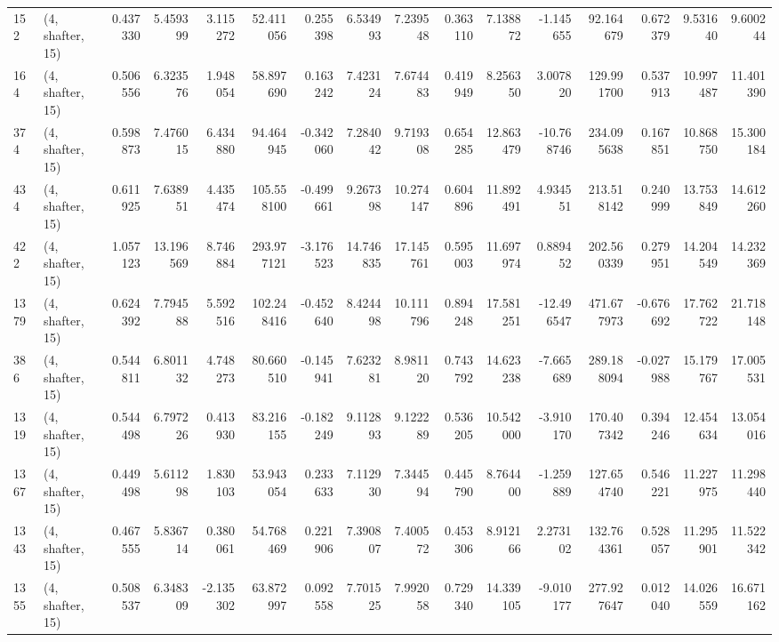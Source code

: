 \begin{tabular}{llrrrrrrrrrrrrrr}
152  &  (4, shafter, 15) &   0.437330 &   5.459399 &   3.115272 &     52.411056 &    0.255398 &    6.534993 &    7.239548 &  0.363110 &   7.138872 &  -1.145655 &    92.164679 &   0.672379 &   9.531640 &   9.600244 \\
164  &  (4, shafter, 15) &   0.506556 &   6.323576 &   1.948054 &     58.897690 &    0.163242 &    7.423124 &    7.674483 &  0.419949 &   8.256350 &   3.007820 &   129.991700 &   0.537913 &  10.997487 &  11.401390 \\
374  &  (4, shafter, 15) &   0.598873 &   7.476015 &   6.434880 &     94.464945 &   -0.342060 &    7.284042 &    9.719308 &  0.654285 &  12.863479 & -10.768746 &   234.095638 &   0.167851 &  10.868750 &  15.300184 \\
434  &  (4, shafter, 15) &   0.611925 &   7.638951 &   4.435474 &    105.558100 &   -0.499661 &    9.267398 &   10.274147 &  0.604896 &  11.892491 &   4.934551 &   213.518142 &   0.240999 &  13.753849 &  14.612260 \\
422  &  (4, shafter, 15) &   1.057123 &  13.196569 &   8.746884 &    293.977121 &   -3.176523 &   14.746835 &   17.145761 &  0.595003 &  11.697974 &   0.889452 &   202.560339 &   0.279951 &  14.204549 &  14.232369 \\
1379 &  (4, shafter, 15) &   0.624392 &   7.794588 &   5.592516 &    102.248416 &   -0.452640 &    8.424498 &   10.111796 &  0.894248 &  17.581251 & -12.496547 &   471.677973 &  -0.676692 &  17.762722 &  21.718148 \\
386  &  (4, shafter, 15) &   0.544811 &   6.801132 &   4.748273 &     80.660510 &   -0.145941 &    7.623281 &    8.981120 &  0.743792 &  14.623238 &  -7.665689 &   289.188094 &  -0.027988 &  15.179767 &  17.005531 \\
1319 &  (4, shafter, 15) &   0.544498 &   6.797226 &   0.413930 &     83.216155 &   -0.182249 &    9.112893 &    9.122289 &  0.536205 &  10.542000 &  -3.910170 &   170.407342 &   0.394246 &  12.454634 &  13.054016 \\
1367 &  (4, shafter, 15) &   0.449498 &   5.611298 &   1.830103 &     53.943054 &    0.233633 &    7.112930 &    7.344594 &  0.445790 &   8.764400 &  -1.259889 &   127.654740 &   0.546221 &  11.227975 &  11.298440 \\
1343 &  (4, shafter, 15) &   0.467555 &   5.836714 &   0.380061 &     54.768469 &    0.221906 &    7.390807 &    7.400572 &  0.453306 &   8.912166 &   2.273102 &   132.764361 &   0.528057 &  11.295901 &  11.522342 \\
1355 &  (4, shafter, 15) &   0.508537 &   6.348309 &  -2.135302 &     63.872997 &    0.092558 &    7.701525 &    7.992058 &  0.729340 &  14.339105 &  -9.010177 &   277.927647 &   0.012040 &  14.026559 &  16.671162 \\

\end{tabular}

